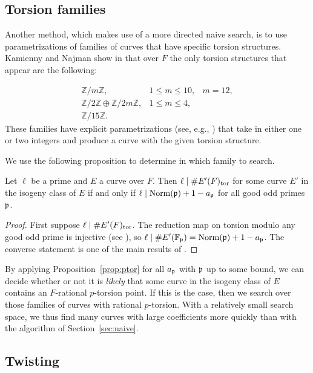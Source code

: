 \documentclass{amsart}
\begin{document}
\subsection{Torsion families}\label{sec:torsion}

Another method, which makes use of a more directed naive search, is to
use parametrizations of families of curves that have specific torsion
structures.  Kamienny and Najman show in \cite{kamienny-najman} that
over $F$ the only torsion structures that appear are the following:

$$\begin{array}{lll}
\mathbb{Z}/m\mathbb{Z},   &1 \leq m \leq 10,& m = 12,\\
\mathbb{Z}/2\mathbb{Z} \oplus \mathbb{Z}/2m\mathbb{Z}, &  1 \leq m \leq 4,&\\
\mathbb{Z}/15\mathbb{Z}.&&
\end{array}$$
These families have explicit
parametrizations (see, e.g., \cite{kubert:torfam}) that take
in either one or two integers and produce a curve with the given torsion
structure. 

We use the following proposition to determine in which family to
search.
\begin{proposition}\label{prop:ptor}
Let $\ell$ be a prime and $E$ a curve over $F$.
Then $\ell \mid \# E'(F)_{\operatorname{tor}}$ for some curve $E'$ in the isogeny class
of $E$ if and only if $\ell \mid \operatorname{Norm}(\mathfrak{p})+1 - a_{\mathfrak{p}}$ for all good
odd primes $\mathfrak{p}$.
\end{proposition}
\begin{proof}
First suppose $\ell  \mid \# E'(F)_{\operatorname{tor}}$. 
The reduction map on torsion modulo any good odd prime is injective
(see \cite[Appendix]{katz:torsion}), 
so $\ell \mid \#E'(\mathbb{F}_{\mathfrak{p}}) = \operatorname{Norm}(\mathfrak{p})+1 - a_{\mathfrak{p}}$.
The converse statement is one of the main results
of \cite{katz:torsion}.
\end{proof}

By applying Proposition~\ref{prop:ptor} for all $a_{\mathfrak{p}}$ with $\mathfrak{p}$ up
to some bound, we can decide whether or not it is {\em likely} that
some curve in the isogeny class of $E$ contains an $F$-rational
$p$-torsion point.  If this is the case, then we search over those
families of curves with rational $p$-torsion.  With a relatively small
search space, we thus find many curves with large coefficients more
quickly than with the algorithm of Section~\ref{sec:naive}.



\subsection{Twisting}
\end{document}
